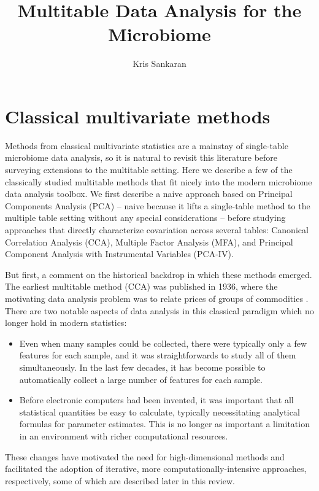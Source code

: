\documentclass{article}
\title{Multitable Data Analysis for the Microbiome}
\author{Kris Sankaran}
\begin{document}
\maketitle

\section{Classical multivariate methods}

Methods from classical multivariate statistics are a mainstay
of single-table microbiome data analysis, so it is natural to revisit
this literature before surveying extensions to the multitable
setting. Here we describe a few of the classically studied multitable
methods that fit nicely into the modern microbiome data analysis
toolbox. We first describe a naive approach based on Principal
Components Analysis (PCA) -- naive because it lifts a single-table
method to the multiple table setting without any special
considerations --  before studying approaches that directly
characterize covariation across several tables: Canonical Correlation
Analysis (CCA), Multiple Factor Analysis (MFA), and Principal
Component Analysis with Instrumental Variables (PCA-IV).

But first, a comment on the historical backdrop in which these methods
emerged. The earliest multitable method (CCA) was published in 1936,
where the motivating data analysis problem was to relate prices of
groups of commodities \cite{hotelling1936relations}. There are two notable
aspects of data analysis in this classical paradigm which no longer
hold in modern statistics:
\begin{itemize}
  \item Even when many samples could be collected, there were
    typically only a few features for each sample, and it was
    straightforwards to study all of them simultaneously. In the last
    few decades, it has become possible to automatically collect a
    large number of features for each sample.
  \item Before electronic computers had been invented, it was
    important that all statistical quantities be easy to
    calculate, typically necessitating analytical formulas for
    parameter estimates. This is no longer as important a limitation
    in an environment with richer computational resources.
\end{itemize}

These changes have motivated the need for high-dimensional methods and
facilitated the adoption of iterative, more computationally-intensive
approaches, respectively, some of which are described later in this
review.
\end{document}

